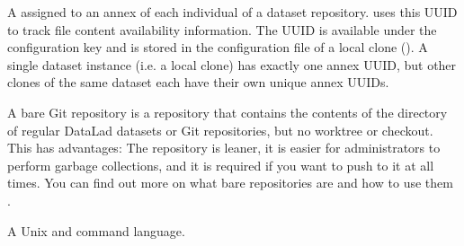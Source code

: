 \begin{description}
\ignorespaces 
\sphinxAtStartPar
A {\hyperref[\detokenize{glossary:term-UUID}]{}} assigned to an annex of each individual {\hyperref[\detokenize{glossary:term-clone}]{}} of a dataset repository.
{\hyperref[\detokenize{glossary:term-git-annex}]{}} uses this UUID to track file content availability information.
The UUID is available under the configuration key  and is stored in the
configuration file of a local clone ().
A single dataset instance (i.e. a local clone) has exactly one annex UUID,
but other clones of the same dataset each have their own unique annex UUIDs.

\ignorespaces 
\sphinxAtStartPar
A bare Git repository is a repository that contains the contents of the 
directory of regular DataLad datasets or Git repositories, but no worktree
or checkout. This has advantages: The repository is leaner, it is easier
for administrators to perform garbage collections, and it is required if you
want to push to it at all times. You can find out more on what bare repositories are and how to use them
.

\ignorespaces 
\sphinxAtStartPar
A Unix {\hyperref[\detokenize{glossary:term-shell}]{}} and command language.


\end{description}
